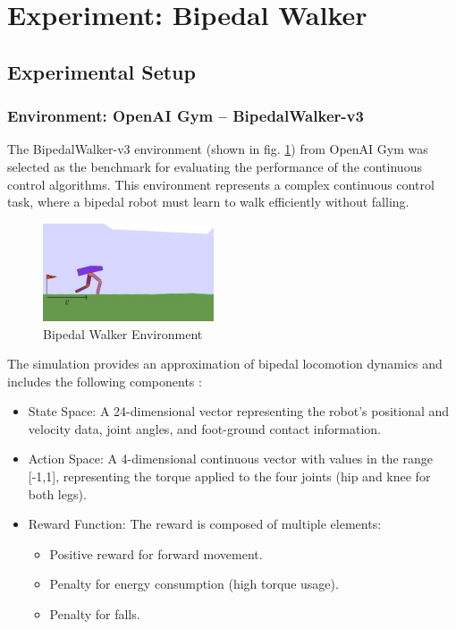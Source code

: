 \section{Experiment: Bipedal Walker}

\subsection{Experimental Setup}

\subsubsection{Environment: OpenAI Gym – BipedalWalker-v3}
The BipedalWalker-v3 environment (shown in fig. \ref{fig:bwe}) from OpenAI Gym \cite{openai2021bipedalwalker} was selected as the benchmark for evaluating the performance of the continuous control algorithms. This environment represents a complex continuous control task, where a bipedal robot must learn to walk efficiently without falling.\\

\begin{figure} %
    \centering
    \includegraphics[width=0.45\textwidth]{BipdalWalker-1.jpg} %
    \caption{Bipedal Walker Environment}
    \label{fig:bwe}
\end{figure}

\noindent The simulation provides an approximation of bipedal locomotion dynamics and includes the following components \cite{pylessons2021bipedalwalker}:

\begin{itemize}
    \item State Space: A 24-dimensional vector representing the robot’s positional and velocity data, joint angles, and foot-ground contact information.
    \item Action Space: A 4-dimensional continuous vector with values in the range [-1,1], representing the torque applied to the four joints (hip and knee for both legs).
    \item Reward Function: The reward is composed of multiple elements: \begin{itemize}
        \item Positive reward for forward movement.
        \item Penalty for energy consumption (high torque usage).
        \item Penalty for falls.
    \end{itemize}
    
\end{itemize}

